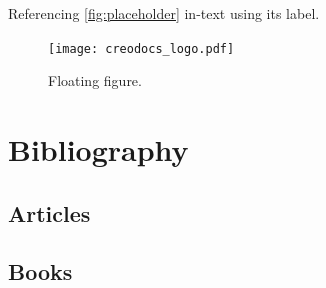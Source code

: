 \documentclass[
	11pt,
	fleqn,
	a4paper,
]{LegrandOrangeBook}
\begin{document}
Referencing \autoref{fig:placeholder} in-text using its label.

\begin{figure}[b] %
    \centering %
    \texttt{[image: creodocs\_logo.pdf]} %
    \caption{Floating figure.}
    \label{fig:floating} %
\end{figure}


\stopcontents[part] %


\chapterimage{} %
\chapterspaceabove{2.5cm} %
\chapterspacebelow{2cm} %


\chapter*{Bibliography}

\section*{Articles}

\printbibliography[heading=bibempty, type=article] %

\section*{Books}
\end{document}
